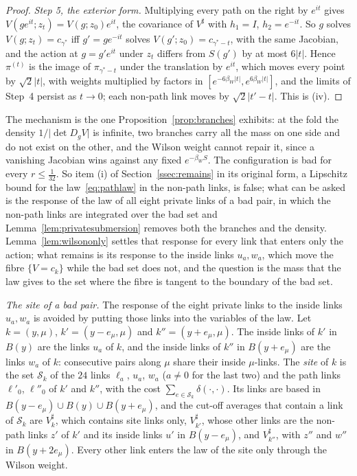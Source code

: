 \documentclass[11pt]{amsart}
\theoremstyle{definition}
\theoremstyle{remark}
\numberwithin{equation}{section}
\begin{document}
\begin{proof}
\emph{Step 5, the exterior form.} Multiplying every path on the right by
$e^{it}$ gives $V(ge^{it};z_t)=V(g;z_0)e^{it}$, the covariance of $V^\sharp$
with $h_1=I$, $h_2=e^{-it}$. So $g$ solves $V(g;z_t)=c_{\gamma^*}$ iff
$g'=ge^{-it}$ solves $V(g';z_0)=c_{\gamma^*-t}$, with the same Jacobian,
and the action at $g=g'e^{it}$ under $z_t$ differs from $S(g')$ by at most
$6|t|$. Hence $\pi^{(t)}$ is the image of $\pi_{\gamma^*-t}$ under the
translation by $e^{it}$, which moves every point by $\sqrt2|t|$, with
weights multiplied by factors in $[e^{-6\beta_W|t|},e^{6\beta_W|t|}]$, and
the limits of Step~4 persist as $t\to0$; each non-path link moves by
$\sqrt2|t'-t|$. This is (iv).
\end{proof}

The mechanism is the one Proposition~\ref{prop:branches} exhibits: at the
fold the density $1/\lvert\det D_gV\rvert$ is infinite, two branches carry
all the mass on one side and do not exist on the other, and the Wilson
weight cannot repair it, since a vanishing Jacobian wins against any fixed
$e^{-\beta_WS}$. The configuration is bad for every $r\le\frac1{32}$. So item
(i) of Section~\ref{ssec:remains} in its original form, a Lipschitz bound for the
law~\eqref{eq:pathlaw} in the non-path links, is false; what can be asked is
the response of the law of all eight private links of a bad pair, in which
the non-path links are integrated over the bad set and
Lemma~\ref{lem:privatesubmersion} removes both the branches and the
density. Lemma~\ref{lem:wilsononly} settles that response for every link
that enters only the action; what remains is its response to the inside
links $u_a,w_a$, which move the fibre $\{V=c_k\}$ while the bad set does
not, and the question is the mass that the law gives to the set where the
fibre is tangent to the boundary of the bad set.

\emph{The site of a bad pair.} The response of the eight private links to
the inside links $u_a,w_a$ is avoided by putting those links into the
variables of the law. Let $k=(y,\mu)$, $k'=(y-e_\mu,\mu)$ and
$k''=(y+e_\mu,\mu)$. The inside links of $k'$ in $B(y)$ are the links
$u_a$ of $k$, and the inside links of $k''$ in $B(y+e_\mu)$ are the links
$w_a$ of $k$: consecutive pairs along $\mu$ share their inside
$\mu$-links. The \emph{site} of $k$ is the set $\mathcal S_k$ of the $24$
links $\ell_a$, $u_a$, $w_a$ ($a\ne0$ for the last two) and the path links
$\ell'_0$, $\ell''_0$ of $k'$ and $k''$, with the cost
$\sum_{e\in\mathcal S_k}\delta(\cdot,\cdot)$. Its links are based in
$B(y-e_\mu)\cup B(y)\cup B(y+e_\mu)$, and the cut-off averages that contain
a link of $\mathcal S_k$ are $V^\sharp_k$, which contains site links only,
$V^\sharp_{k'}$, whose other links are the non-path links $z'$ of $k'$ and
its inside links $u'$ in $B(y-e_\mu)$, and $V^\sharp_{k''}$, with $z''$ and
$w''$ in $B(y+2e_\mu)$. Every other link enters the law of the site only
through the Wilson weight.
\end{document}
